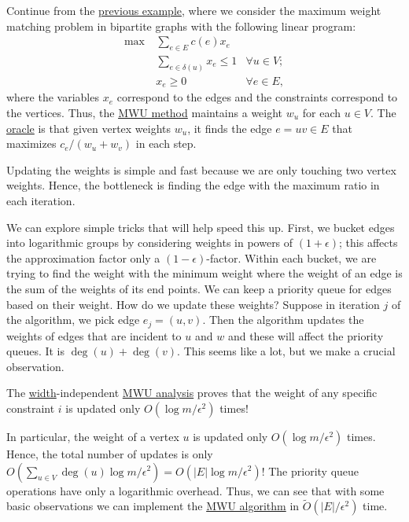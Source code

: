 \begin{eg}
	Continue from the \hyperref[eg:max-weight-bipartite-matching-MWU]{previous example}, where we consider the maximum weight matching problem in bipartite graphs with the following linear program:
	\[
		\begin{aligned}
			\max~ & \sum_{e \in E} c(e) x_e                                \\
			      & \sum_{e \in \delta (u)} x_e \leq 1 & \forall u \in V ; \\
			      & x_e \geq 0                         & \forall e \in E,
		\end{aligned}
	\]
	where the variables \(x_e\) correspond to the edges and the constraints correspond to the vertices. Thus, the \hyperref[algo:MWU-discrete-non-uniform]{MWU method} maintains a weight \(w_u\) for each \(u \in V\). The \hyperref[eq:MWU-oracle-LP]{oracle} is that given vertex weights \(w_u\), it finds the edge \(e = uv \in E\) that maximizes \(c_e / (w_u + w_v)\) in each step.

	\begin{intuition}
		Updating the weights is simple and fast because we are only touching two vertex weights. Hence, the bottleneck is finding the edge with the maximum ratio in each iteration.
	\end{intuition}

	We can explore simple tricks that will help speed this up. First, we bucket edges into logarithmic groups by considering weights in powers of \((1 + \epsilon )\); this affects the approximation factor only a \((1 - \epsilon )\)-factor. Within each bucket, we are trying to find the weight with the minimum weight where the weight of an edge is the sum of the weights of its end points. We can keep a priority queue for edges based on their weight. How do we update these weights? Suppose in iteration \(j\) of the algorithm, we pick edge \(e_j = (u, v)\). Then the algorithm updates the weights of edges that are incident to \(u\) and \(w\) and these will affect the priority queues. It is \(\deg(u) + \deg(v)\). This seems like a lot, but we make a crucial observation.

	\begin{prev}
		The \hyperref[def:width]{width}-independent \hyperref[thm:MWU-discrete-non-uniform]{MWU analysis} proves that the weight of any specific constraint \(i\) is updated only \(O(\log m / \epsilon ^2)\) times!
	\end{prev}

	In particular, the weight of a vertex \(u\) is updated only \(O(\log m / \epsilon ^2)\) times. Hence, the total number of updates is only \(O(\sum_{u \in V} \deg(u) \log m / \epsilon ^2) = O(\lvert E \rvert \log m / \epsilon ^2)\)! The priority queue operations have only a logarithmic overhead. Thus, we can see that with some basic observations we can implement the \hyperref[algo:MWU-discrete-non-uniform]{MWU algorithm} in \(\widetilde{O} (\lvert E \rvert / \epsilon ^2)\) time.
\end{eg}

